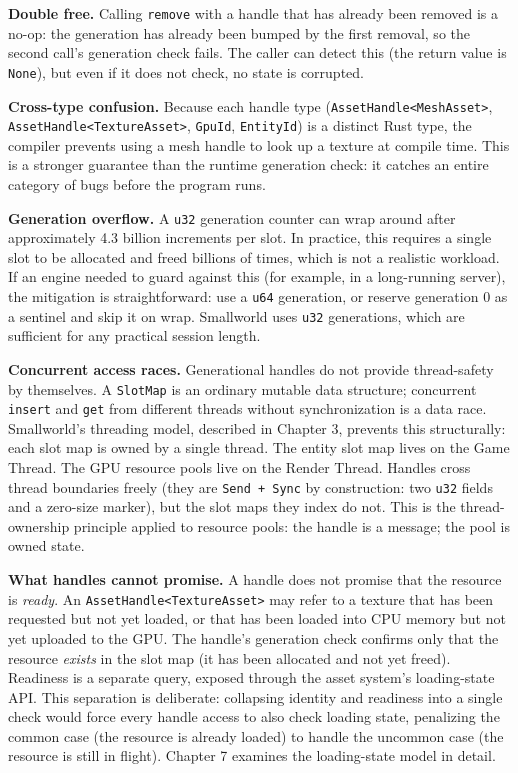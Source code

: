 \documentclass[
  11pt,
  letterpaper,
  DIV=11,
  numbers=noendperiod,
  twoside,
  open=right]{scrreprt}
\begin{document}
\textbf{Double free.} Calling \texttt{remove} with a handle that has
already been removed is a no-op: the generation has already been bumped
by the first removal, so the second call's generation check fails. The
caller can detect this (the return value is \texttt{None}), but even if
it does not check, no state is corrupted.

\textbf{Cross-type confusion.} Because each handle type
(\texttt{AssetHandle\textless{}MeshAsset\textgreater{}},
\texttt{AssetHandle\textless{}TextureAsset\textgreater{}},
\texttt{GpuId}, \texttt{EntityId}) is a distinct Rust type, the compiler
prevents using a mesh handle to look up a texture at compile time. This
is a stronger guarantee than the runtime generation check: it catches an
entire category of bugs before the program runs.

\textbf{Generation overflow.} A \texttt{u32} generation counter can wrap
around after approximately 4.3 billion increments per slot. In practice,
this requires a single slot to be allocated and freed billions of times,
which is not a realistic workload. If an engine needed to guard against
this (for example, in a long-running server), the mitigation is
straightforward: use a \texttt{u64} generation, or reserve generation 0
as a sentinel and skip it on wrap. Smallworld uses \texttt{u32}
generations, which are sufficient for any practical session length.

\textbf{Concurrent access races.} Generational handles do not provide
thread-safety by themselves. A \texttt{SlotMap} is an ordinary mutable
data structure; concurrent \texttt{insert} and \texttt{get} from
different threads without synchronization is a data race. Smallworld's
threading model, described in Chapter 3, prevents this structurally:
each slot map is owned by a single thread. The entity slot map lives on
the Game Thread. The GPU resource pools live on the Render Thread.
Handles cross thread boundaries freely (they are \texttt{Send\ +\ Sync}
by construction: two \texttt{u32} fields and a zero-size marker), but
the slot maps they index do not. This is the thread-ownership principle
applied to resource pools: the handle is a message; the pool is owned
state.

\textbf{What handles cannot promise.} A handle does not promise that the
resource is \emph{ready}. An
\texttt{AssetHandle\textless{}TextureAsset\textgreater{}} may refer to a
texture that has been requested but not yet loaded, or that has been
loaded into CPU memory but not yet uploaded to the GPU. The handle's
generation check confirms only that the resource \emph{exists} in the
slot map (it has been allocated and not yet freed). Readiness is a
separate query, exposed through the asset system's loading-state API.
This separation is deliberate: collapsing identity and readiness into a
single check would force every handle access to also check loading
state, penalizing the common case (the resource is already loaded) to
handle the uncommon case (the resource is still in flight). Chapter 7
examines the loading-state model in detail.
\end{document}
